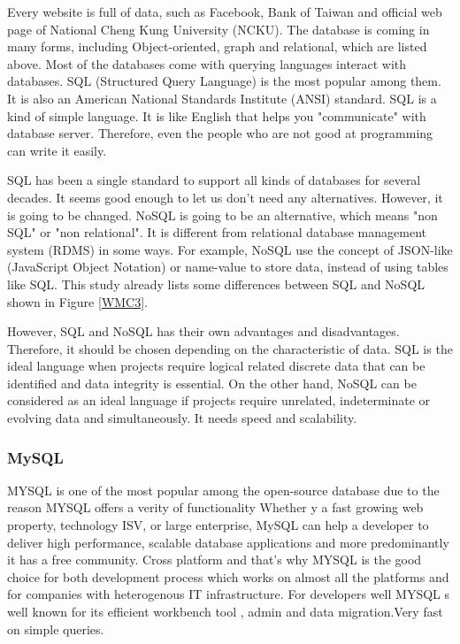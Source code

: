 Every website is full of data, such as Facebook, Bank of Taiwan and official web page of National Cheng Kung University (NCKU).
The database is coming in many forms, including Object-oriented, graph and relational, which are listed above.
Most of the databases come with querying languages interact with databases.
SQL (Structured Query Language) is the most popular among them.
It is also an American National Standards Institute (ANSI) standard.
SQL is a kind of simple language.
It is like English that helps you "communicate" with database server.
Therefore, even the people who are not good at programming can write it easily.


SQL has been a single standard to support all kinds of databases for several decades.
It seems good enough to let us don't need any alternatives.
However, it is going to be changed.
NoSQL is going to be an alternative, which means "non SQL" or "non relational".
It is different from relational database management system (RDMS) in some ways.
For example, NoSQL use the concept of JSON-like (JavaScript Object Notation) or name-value to store data, instead of using tables like SQL.
This study already lists some differences between SQL and NoSQL shown in Figure \ref{WMC3}.


However, SQL and NoSQL has their own advantages and disadvantages.
Therefore, it should be chosen depending on the characteristic of data.
SQL is the ideal language when projects require logical related discrete data that can be identified and data integrity is essential.
On the other hand, NoSQL can be considered as an ideal language if projects require unrelated, indeterminate or evolving data and simultaneously. 
It needs speed and scalability.

\subsubsection{MySQL}
MYSQL is one of the  most popular among the 
open-source database due to the reason  MYSQL 
offers a verity of functionality Whether y a fast growing web
property, technology ISV, or large enterprise, MySQL can help a developer
to deliver high performance, scalable database applications and more predominantly it has a free community. Cross platform and 
that's why MYSQL is  the good choice for  both development process
which works on almost all the  platforms and for companies
with heterogenous IT infrastructure. For  developers well MYSQL
s well known  for  its efficient workbench tool , 
admin and data migration.Very fast on simple queries.

